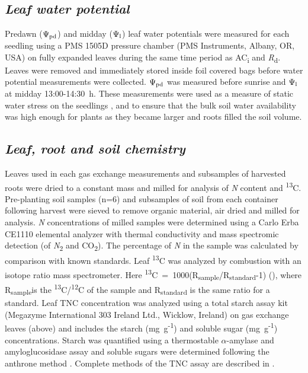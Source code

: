 \documentclass[a4paper]{article}\usepackage[]{graphicx}\usepackage[]{color}
\begin{document}
\subsection*{\textit{Leaf water potential}}
Predawn ($\Psi\textsubscript{pd}$) and midday ($\Psi\textsubscript{l}$) leaf water potentials were measured for each seedling using a PMS 1505D pressure chamber (PMS Instruments, Albany, OR, USA) on fully expanded leaves during the same time period as AC\textsubscript{i} and \textit{R}\textsubscript{d}. Leaves were removed and immediately stored inside foil covered bags before water potential measurements were collected. $\Psi\textsubscript{pd}$ was measured before sunrise and $\Psi\textsubscript{l}$ at midday 13:00-14:30~h. These measurements were used as a measure of static water stress on the seedlings \citep{sellin1999does}, and to ensure that the bulk soil water availability was high enough for plants as they became larger and roots filled the soil volume. 

\subsection*{\textit{Leaf, root and soil chemistry}}
Leaves used in each gas exchange measurements and subsamples of harvested roots were dried to a constant mass and milled for analysis of \textit{N} content and {\textdelta}\textsuperscript{13}C. Pre-planting soil samples (n=6) and subsamples of soil from each container following harvest were sieved to remove organic material, air dried and milled for analysis. \textit{N} concentrations of milled samples were determined using a Carlo Erba CE1110 elemental analyzer with thermal conductivity and mass spectromic detection (of \textit{N}\textsubscript{2} and CO\textsubscript{2}).  The percentage of \textit{N} in the sample was calculated by comparison with known standards. Leaf {\textdelta}\textsuperscript{13}C was analyzed by combustion with an isotope ratio mass spectrometer. Here {\textdelta}\textsuperscript{13}C~=~1000(R\textsubscript{sample}/R\textsubscript{standard}-1) (\text{\textperthousand}), where R\textsubscript{sample}is the \textsuperscript{13}C/\textsuperscript{12}C of the sample and R\textsubscript{standard} is the same ratio for a standard. Leaf TNC concentration was analyzed using a total starch assay kit (Megazyme International 303 Ireland Ltd., Wicklow, Ireland) on gas exchange leaves (above) and includes the starch (mg~g\textsuperscript{-1}) and soluble sugar (mg~g\textsuperscript{-1}) concentrations. Starch was quantified using a thermostable $\alpha$-amylase and amyloglucosidase assay \citep{McCleary_starch} and soluble sugars were determined following the anthrone method \citep{ebell1969variation}. Complete methods of the TNC assay are described in \citep{mitchell2013drought}.
\end{document}
